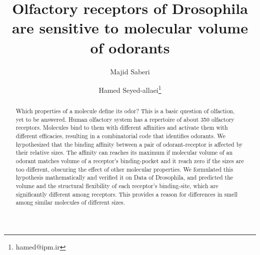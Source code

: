 \documentclass[11pt]{paper} %
\title{Olfactory receptors of Drosophila are sensitive to molecular volume of odorants}
\author{Majid Saberi \and Hamed Seyed-allaei\thanks{hamed@ipm.ir}}
\begin{document}

\maketitle

\begin{abstract} 
Which properties of a molecule define its odor? This is a basic question of olfaction, 
yet to be answered. Human olfactory system has a repertoire of about 350 olfactory receptors. 
Molecules bind to them with different affinities and activate them with different efficacies, 
resulting in a combinatorial code that identifies odorants. 
We hypothesized that the binding affinity between a pair of odorant-receptor is affected by their relative sizes. 
The affinity can reaches its maximum if molecular volume of an odorant matches volume of a receptor's binding-pocket 
and it reach zero if the sizes are too different, 
obscuring the effect of other molecular properties. 
We formulated this hypothesis mathematically and verified it on Data of Drosophila, 
and predicted the volume and the structural flexibility of each receptor's binding-site, 
which are significantly different among receptors. 
This provides a reason for differences in smell among similar molecules of different sizes. 
\end{abstract}



\end{document}
